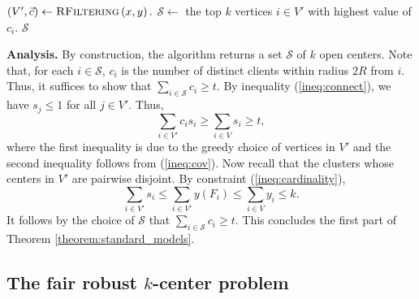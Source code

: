 \documentclass[a4paper,11pt]{article}
\renewcommand{\S}{\mathcal{S}}
\begin{document}
\begin{algorithm}[h]
\caption{$\textsc{RkCenterRound}\left(x,y \right)$}
\begin{algorithmic}[1]
\STATE $(V',\vec{c}) \gets \textsc{RFiltering}\left(x,y \right).$
\STATE $\S \gets $ the top $k$ vertices $i \in V'$ with highest value of $c_i$.
\RETURN $\S$
\end{algorithmic} 
\end{algorithm}

\textbf{Analysis.} By construction, the algorithm returns a set $\S$ of $k$ open centers. Note that, for each $i \in \S$, $c_i$ is the number of distinct clients within radius $2R$ from $i$. Thus, it suffices to show that $\sum_{i \in \S} c_i \geq t$. 
By inequality (\ref{ineq:connect}), we have $s_j \leq 1$ for all $j \in V'$. Thus,
$$  \sum_{i \in V'} c_i s_i \geq \sum_{i \in V} s_i \geq t, $$
where the first inequality is due to the greedy choice of vertices in $V'$ and the second inequality follows from (\ref{ineq:cov}). Now recall that the clusters whose centers in $V'$ are pairwise disjoint. By constraint (\ref{ineq:cardinality}),
$$\sum_{i \in V'} s_i \leq \sum_{i \in V'} y(F_i) \leq \sum_{i \in V} y_i \leq k.$$ 
It follows by the choice of $\S$ that $\sum_{i \in \S} c_i \geq t$. This concludes the first part of Theorem \ref{theorem:standard_models}.




\subsection{The fair robust $k$-center problem}
\end{document}
